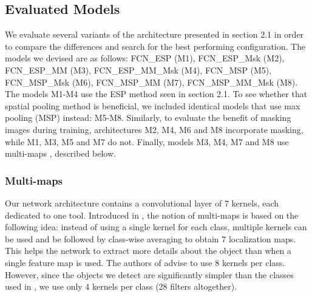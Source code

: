 \documentclass[english,runningheads,a4paper]{llncs}
\begin{document}
\subsection{Evaluated Models}
We evaluate several variants of the architecture presented in section 2.1 in order to compare the differences and search for the best performing configuration. The models we devised are as follows: FCN\_ESP (M1), FCN\_ESP\_Msk (M2), FCN\_ESP\_MM (M3), FCN\_ESP\_MM\_Msk (M4), FCN\_MSP (M5), FCN\_MSP\_Msk (M6), FCN\_MSP\_MM (M7), FCN\_MSP\_MM\_Msk (M8). The models M1-M4 use the ESP method seen in section 2.1. To see whether that spatial pooling method is beneficial, we included identical models that use max pooling (MSP) instead: M5-M8.
Similarly, to evaluate the benefit of masking images during training, architectures M2, M4, M6 and M8 incorporate masking, while M1, M3, M5 and M7 do not. Finally, models M3, M4, M7 and M8 use multi-maps \cite{durand:cvpr17}, described below.

\subsubsection{Multi-maps}
Our network architecture contains a convolutional layer of 7 kernels, each dedicated to one tool. Introduced in \cite{durand:cvpr17}, the notion of multi-maps is based on the following idea: instead of using a single kernel for each class, multiple kernels can be used and be followed by class-wise averaging to obtain 7 localization maps. 
This helps the network to extract more details about the object than when a single feature map is used.
The authors of \cite{durand:cvpr17} advise to use 8 kernels per class. However, since the objects we detect are significantly simpler than the classes used in \cite{durand:cvpr17}, we use only 4 kernels per class (28 filters altogether).
\end{document}

